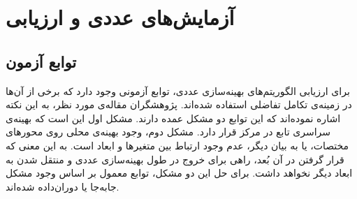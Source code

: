 \documentclass[12pt,a4paper]{article}
\theoremstyle{definition}
\theoremstyle{theorem}
\theoremstyle{definition}
\begin{document}
\newpage
\section{آزمایش‌های عددی و ارزیابی}

\subsection{توابع آزمون}

برای ارزیابی الگوریتم‌های بهینه‌سازی عددی، توابع آزمونی وجود دارد که برخی از آن‌ها در زمینه‌ی تکامل تفاضلی استفاده شده‌اند. پژوهشگران مقاله‌ی مورد نظر، به این نکته اشاره نموده‌اند که این توابع دو مشکل عمده دارند. مشکل اول این است که بهینه‌ی سراسری تابع در مرکز قرار دارد. مشکل دوم، وجود بهینه‌ی محلی روی محورهای مختصات، یا به بیان دیگر، عدم وجود ارتباط بین متغیرها و ابعاد است. به این معنی که قرار گرفتن در آن بُعد، راهی برای خروج در طول بهینه‌سازی عددی و منتقل شدن به ابعاد دیگر نخواهد داشت. برای حل این دو مشکل، توابع معمول بر اساس وجود مشکل جابه‌جا یا دوران‌داده شده‌اند. 
\end{document}
